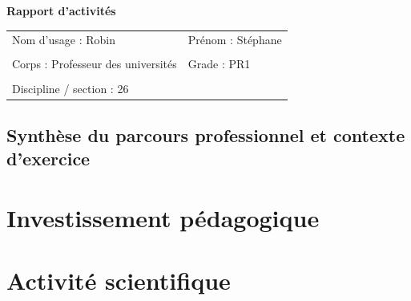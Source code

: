 \documentclass[12pt, a4paper, french]{article}
\begin{document}

\noindent
{\huge\bf Rapport d'activités}



\bigskip
\noindent
\begin{tabular}{p{}p{}}
  \hline
  Nom d'usage : {\sc Robin} & Prénom : Stéphane \\ 
  \\
  Corps : Professeur des universités & Grade : PR1 \\
  \\
  Discipline / section : 26 \\
  \hline
\end{tabular}


\subsection*{Synthèse du parcours professionnel et contexte d’exercice} 


\section{Investissement pédagogique \label{sec:ens}}


\section{Activité scientifique \label{sec:rech}} 

\end{document}

